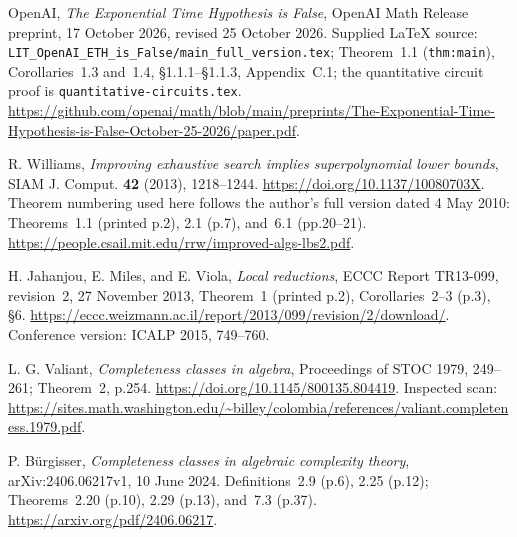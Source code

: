 OpenAI, \emph{The Exponential Time Hypothesis is False},
OpenAI Math Release preprint, 17 October 2026, revised 25 October 2026.
Supplied LaTeX source:
\texttt{LIT\_OpenAI\_ETH\_is\_False/main\_full\_version.tex};
Theorem~1.1 (\texttt{thm:main}), Corollaries~1.3 and~1.4,
\S1.1.1--\S1.1.3, Appendix~C.1; the quantitative circuit proof is
\texttt{quantitative-circuits.tex}.
\url{https://github.com/openai/math/blob/main/preprints/The-Exponential-Time-Hypothesis-is-False-October-25-2026/paper.pdf}.

R. Williams, \emph{Improving exhaustive search implies superpolynomial
lower bounds}, SIAM J. Comput. \textbf{42} (2013), 1218--1244.
\url{https://doi.org/10.1137/10080703X}.
Theorem numbering used here follows the author's full version dated
4 May 2010: Theorems~1.1 (printed p.2), 2.1 (p.7), and~6.1
(pp.20--21).
\url{https://people.csail.mit.edu/rrw/improved-algs-lbs2.pdf}.

H. Jahanjou, E. Miles, and E. Viola, \emph{Local reductions},
ECCC Report TR13-099, revision~2, 27 November 2013,
Theorem~1 (printed p.2), Corollaries~2--3 (p.3), \S6.
\url{https://eccc.weizmann.ac.il/report/2013/099/revision/2/download/}.
Conference version: ICALP 2015, 749--760.

L. G. Valiant, \emph{Completeness classes in algebra},
Proceedings of STOC 1979, 249--261; Theorem~2, p.254.
\url{https://doi.org/10.1145/800135.804419}.
Inspected scan:
\url{https://sites.math.washington.edu/~billey/colombia/references/valiant.completeness.1979.pdf}.

P. B\"urgisser, \emph{Completeness classes in algebraic complexity theory},
arXiv:2406.06217v1, 10 June 2024.
Definitions~2.9 (p.6), 2.25 (p.12);
Theorems~2.20 (p.10), 2.29 (p.13), and~7.3 (p.37).
\url{https://arxiv.org/pdf/2406.06217}.
